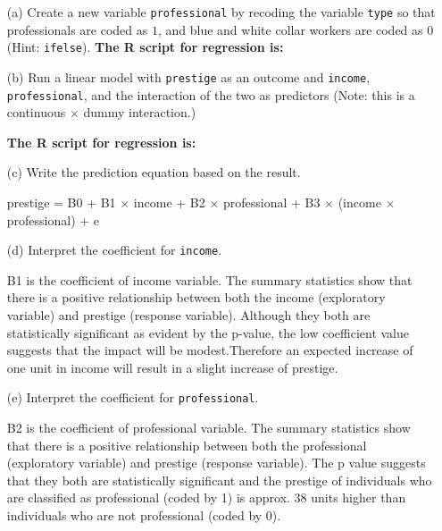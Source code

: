 \documentclass[12pt,letterpaper]{article}
\begin{document}
\newpage
\begin{enumerate}
	
	\item [(a)]
	Create a new variable \texttt{professional} by recoding the variable \texttt{type} so that professionals are coded as $1$, and blue and white collar workers are coded as $0$ (Hint: \texttt{ifelse}).
	\textbf{		The R script for regression is:}		  
	\vspace{1cm}
	
	
	\item [(b)]
	Run a linear model with \texttt{prestige} as an outcome and \texttt{income}, \texttt{professional}, and the interaction of the two as predictors (Note: this is a continuous $\times$ dummy interaction.)
	
	\textbf{		The R script for regression is:}	  
	
	\vspace{1cm}
	\item [(c)]
	Write the prediction equation based on the result.
	\item[] prestige = B0 + B1 × income + B2 × professional + B3 × (income × professional) + e
	\vspace{2cm}
	\item [(d)]
	Interpret the coefficient for \texttt{income}.
	
	\item[] B1 is the coefficient of income variable. The summary statistics show that there is a positive relationship between both the income (exploratory variable) and
	prestige (response variable). Although they both are statistically significant
	as evident by the p-value, the low coefficient value suggests that the impact
	will be modest.Therefore an expected increase of one unit in  income will 
	result in a slight increase of prestige. 
	
	\vspace{2cm}	
	\item [(e)]
	Interpret the coefficient for \texttt{professional}.
	
	\item[] B2 is the coefficient of professional variable. The summary statistics show that there is a positive relationship between both the professional (exploratory variable) and prestige (response variable). The p value suggests that they both are statistically significant and the prestige of individuals who are classified as professional (coded by 1) is approx. 38 units higher than individuals who are not professional (coded by 0).
	

\end{enumerate}
\end{document}
